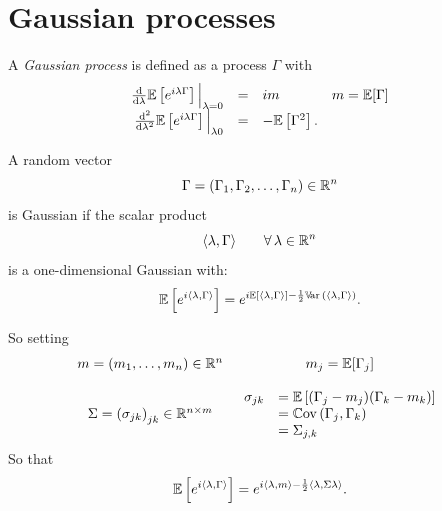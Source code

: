 \documentclass{report}
\begin{document}
\section{Gaussian processes}
\begin{definition}
	A \emph{Gaussian process} is defined as a process $\Gamma$ with
	\begin{equation*}
		\begin{array}{rclr}
			\frac{\mathop{}\!\mathrm{d}}{\mathop{}\!\mathrm{d} \lambda}\mathbb{E}\left[e^{i\lambda\Gamma}\right]\Big|_{\lambda=0}&=&im&m=\mathbb{E}[\Gamma]\\
			\frac{\mathop{}\!\mathrm{d}^{2}}{\mathop{}\!\mathrm{d}\lambda^{2}}\mathbb{E}\left[e^{i\lambda\Gamma}\right]\Big|_{\lambda 0}&=&-\mathbb{E}\left[\Gamma^{2}\right].&
		\end{array}
	\end{equation*}
\end{definition}
\begin{definition}
	A random vector
	\begin{equation*}
		\Gamma=(\Gamma_{1},\Gamma_{2},\ldots,\Gamma_{n})\in\mathbb{R}^{n}
	\end{equation*}
	is Gaussian if the scalar product 
	\begin{equation*}
		\langle\lambda,\Gamma\rangle\qquad\forall\,\lambda\in\mathbb{R}^{n}
	\end{equation*}
	is a one-dimensional Gaussian \rv{} with:
	\begin{equation*}
		\mathbb{E}\left[e^{i\langle\lambda,\Gamma\rangle}\right]=e^{i\mathbb{E}\left[\langle\lambda,\Gamma\rangle\right]-\frac{1}{2}\mathbb{V}\!\mathrm{ar}\,\left(\langle\lambda,\Gamma\rangle\right)}.
	\end{equation*}
\end{definition}
So setting 
\begin{equation*}
	\begin{array}{cc}
		m=(m_{1},\ldots,m_{n})\in\mathbb{R}^{n}&m_{j}=\mathbb{E}[\Gamma_{j}]\\
		&\\
		\Sigma={(\sigma_{jk})}_{jk}\in\mathbb{R}^{n\times m}&\begin{array}{rl}
			\sigma_{jk}&=\mathbb{E}\left[(\Gamma_{j}-m_{j})(\Gamma_{k}-m_{k})\right]\\
			&=\mathbb{C}\mathrm{ov}\,(\Gamma_{j},\Gamma_{k})\\
			&=\Sigma_{j,k}
		\end{array}
	\end{array}
\end{equation*}
So that 
\begin{equation*}
	\mathbb{E}\left[e^{i\langle\lambda,\Gamma\rangle}\right]=e^{i\langle\lambda,m\rangle-\frac{1}{2}	\langle\lambda,\Sigma\lambda\rangle}.
\end{equation*}
\end{document}
